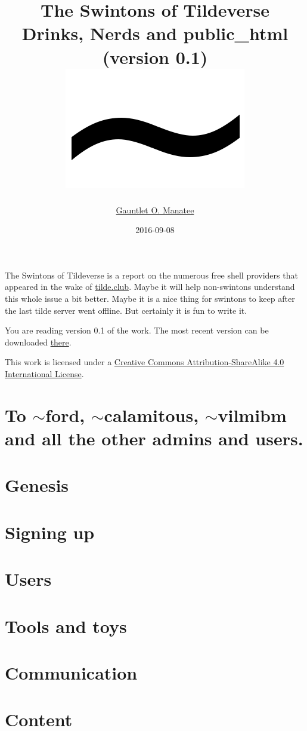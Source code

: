 \documentclass[12pt]{report}
\title{
	{The Swintons of Tildeverse}\\
	{\large Drinks, Nerds and public\_html\\(version 0.1)}\\
	{\includegraphics{tilde02.png}}
}
\author{\href{mailto:spukspital@openmailbox.org}{Gauntlet O. Manatee}}
\date{2016-09-08}
\begin{document}
\maketitle
\chapter*{}
The Swintons of Tildeverse is a report on the numerous free shell providers that appeared in the wake of \href{http://www.tilde.club/}{tilde.club}. Maybe it will help non-swintons understand this whole issue a bit better. Maybe it is a nice thing for swintons to keep after the last tilde server went offline. But certainly it is fun to write it.

You are reading version 0.1 of the work. The most recent version can be downloaded \href{http://www.ctrl-c.club/~gauntlet/tsot#download}{there}.

This work is licensed under a \href{http://creativecommons.org/licenses/by-sa/4.0/}{Creative Commons Attribution-ShareAlike 4.0 International License}.
\chapter*{To $\sim$ford, $\sim$calamitous, $\sim$vilmibm and all the other admins and users.}
\tableofcontents{}
\chapter{Genesis}

\chapter{Signing up}

\chapter{Users}

\chapter{Tools and toys}

\chapter{Communication}

%
\chapter{Content}

\end{document}

